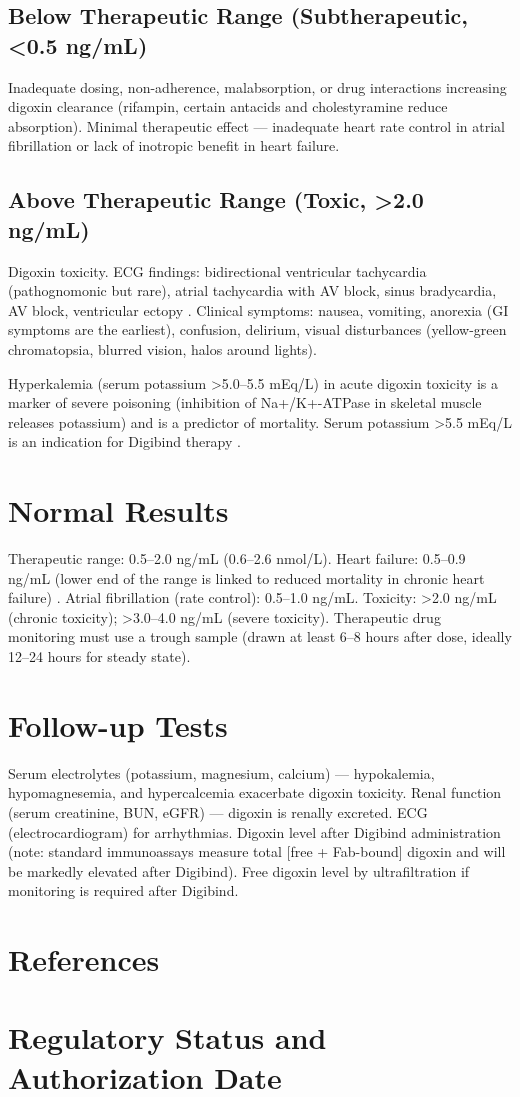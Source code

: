 \subsection*{Below Therapeutic Range (Subtherapeutic, <0.5 ng/mL)}
Inadequate dosing, non-adherence, malabsorption, or drug interactions increasing digoxin clearance (rifampin, certain antacids and cholestyramine reduce absorption). Minimal therapeutic effect --- inadequate heart rate control in atrial fibrillation or lack of inotropic benefit in heart failure.

\subsection*{Above Therapeutic Range (Toxic, >2.0 ng/mL)}
Digoxin toxicity. ECG findings: bidirectional ventricular tachycardia (pathognomonic but rare), atrial tachycardia with AV block, sinus bradycardia, AV block, ventricular ectopy \cite{goldberger2018clinical}. Clinical symptoms: nausea, vomiting, anorexia (GI symptoms are the earliest), confusion, delirium, visual disturbances (yellow-green chromatopsia, blurred vision, halos around lights).

Hyperkalemia (serum potassium >5.0--5.5 mEq/L) in acute digoxin toxicity is a marker of severe poisoning (inhibition of Na+/K+-ATPase in skeletal muscle releases potassium) and is a predictor of mortality. Serum potassium >5.5 mEq/L is an indication for Digibind therapy \cite{bauman2006mechanisms}.

\section*{Normal Results}
Therapeutic range: 0.5--2.0 ng/mL (0.6--2.6 nmol/L). Heart failure: 0.5--0.9 ng/mL (lower end of the range is linked to reduced mortality in chronic heart failure) \cite{yancy2013accf}. Atrial fibrillation (rate control): 0.5--1.0 ng/mL. Toxicity: >2.0 ng/mL (chronic toxicity); >3.0--4.0 ng/mL (severe toxicity). Therapeutic drug monitoring must use a trough sample (drawn at least 6--8 hours after dose, ideally 12--24 hours for steady state).

\section*{Follow-up Tests}
Serum electrolytes (potassium, magnesium, calcium) --- hypokalemia, hypomagnesemia, and hypercalcemia exacerbate digoxin toxicity. Renal function (serum creatinine, BUN, eGFR) --- digoxin is renally excreted. ECG (electrocardiogram) for arrhythmias. Digoxin level after Digibind administration (note: standard immunoassays measure total [free + Fab-bound] digoxin and will be markedly elevated after Digibind). Free digoxin level by ultrafiltration if monitoring is required after Digibind.

\section*{References}



\clearpage
\section*{Regulatory Status and Authorization Date}

\clearpage
